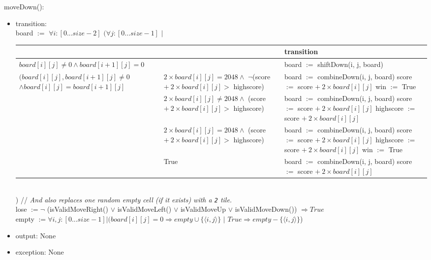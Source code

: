 \documentclass[12pt]{article}
\begin{document}
\newpage

\noindent moveDown():
\begin{itemize}
\item transition:\\ 
board $:=$ $\forall i : [0...size-2]$ $(\forall j : [0...size-1]$ $|$
\begin{table}[hbt!]
\centering
\begin{tabular}{|l|l|l|}
\cline{3-3}
\multicolumn{1}{l}{} &  & transition \\
\hline
\multicolumn{2}{|l|}{$board[i][j] \ne 0 \land board[i+1][j] = 0$} & board $:=$ shiftDown(i, j, board)\\
\hline
\shortstack{$(board[i][j], board[i+1][j] \ne 0$ \\$\land board[i][j] = board[i+1][j]$} & \shortstack{$2\times board[i][j] = 2048 \land$ \\ $\neg$(score $+ \: 2\times board[i][j] > $ highscore) } & \shortstack{board $:=$ combineDown(i, j, board)\\ score $:=$ score $+\: 2\times board[i][j]$\\ win $:=$ True}\\
\cline{2-3}
 & \shortstack{$2\times board[i][j] \ne 2048 \land$ \\ (score $+ \: 2\times board[i][j] > $ highscore) } & \shortstack{board $:=$ combineDown(i, j, board)\\ score $:=$ score $+\: 2\times board[i][j]$\\ highscore $:=$ score $+\: 2\times board[i][j]$}\\
\cline{2-3}
  & \shortstack{$2\times board[i][j] = 2048 \land$ \\ (score $+ \: 2\times board[i][j] > $ highscore) }  & \shortstack{board $:=$ combineDown(i, j, board)\\ score $:=$ score $+\: 2\times board[i][j]$\\ highscore $:=$ score $+\: 2\times board[i][j]$\\ win $:=$ True}\\
\cline{2-3}
  & True & \shortstack{board $:=$ combineDown(i, j, board)\\ score $:=$ score $+\: 2\times board[i][j]$}\\
\hline
\end{tabular}
\end{table}
\\
) // \textit{And also replaces one random empty cell (if it exists) with a \texttt{2} tile.}\\
lose $:= \neg$ (isValidMoveRight() $\lor$ isValidMoveLeft() $\lor$ isValidMoveUp $\lor$ isValidMoveDown()) $\Rightarrow True$\\
empty $:= \forall i, j : [0...size-1] | (board[i][j] = 0 \Rightarrow empty \cup \{\langle i, j \rangle\}$ $|$ $True \Rightarrow empty - \{\langle i, j \rangle\}$)
\item output: None
\item exception: None
\end{itemize}
\end{document}
